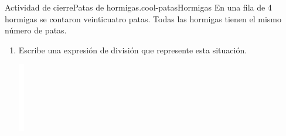 \documentclass[14pt]{extarticle}
\begin{document}
\begin{project}{Actividad de cierre}{Patas de hormigas.}{cool-patasHormigas}%
En una fila de 4 hormigas se contaron veinticuatro patas. Todas las hormigas tienen el mismo número de patas.%
\par
%
\begin{enumerate}[label={(\alph*)}]
\item{}Escribe una expresión de división que represente esta situación.%
\begin{image}{0}{1}{0}{}%
\includegraphics[max width=\linewidth, center]{external/whitespace-tikz/2cm.pdf}

\end{image}
\end{enumerate}
\end{project}
\end{document}
